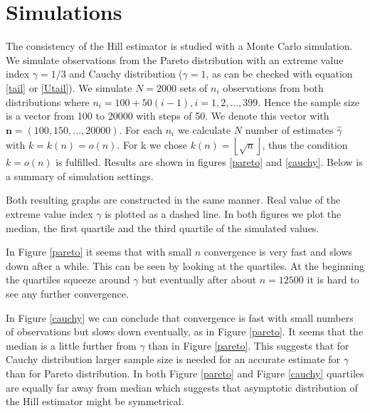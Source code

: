 \documentclass[english,12pt,a4paper,pdftex,sci,utf8]{aaltothesis} %
\begin{document}
\clearpage
\section{Simulations}
\label{simut}

The consistency of the Hill estimator is studied with a Monte Carlo simulation. We simulate observations from the Pareto distribution with an extreme value index $\gamma=1/3$ and Cauchy distribution ($\gamma=1$, as can be checked with equation \eqref{tail} or \eqref{Utail}). We simulate $N=2000$ sets of $n_i$ observations from both distributions where $n_i=100+50(i-1), i=1,2,...,399$. Hence the sample size is a vector from 100 to 20000 with steps of 50. We denote this vector with $\textbf{n}=(100,150,...,20000)$. For each $n_i$ we calculate $N$ number of estimates $\hat{\gamma}$ with $k=k(n)=o(n)$. For k we chose $k(n)=\left \lfloor \sqrt{n} \right \rfloor$, thus the condition $k=o(n)$ is fulfilled. Results are shown in figures \ref{pareto} and \ref{cauchy}. Below is a summary of simulation settings.


Both resulting graphs are constructed in the same manner. Real value of the extreme value index $\gamma$  is plotted as a dashed line. In both figures we plot the median, the first quartile and the third quartile of the simulated values.

In Figure \ref{pareto} it seems that with small $n$ convergence is very fast and slows down after a while. This can be seen by looking at the quartiles. At the beginning the quartiles squeeze around $\gamma$ but eventually after about $n=12500$ it is hard to see any further convergence.

In Figure \ref{cauchy} we can conclude that convergence is fast with small numbers of observations but slows down eventually, as in Figure \ref{pareto}. It seems that the median is a little further from $\gamma$ than in Figure \ref{pareto}. This suggests that for Cauchy distribution larger sample size is needed for an accurate estimate for $\gamma$ than for Pareto distribution. In both Figure \ref{pareto} and Figure \ref{cauchy} quartiles are equally far away from median which suggests that asymptotic distribution of the Hill estimator might be symmetrical.
\end{document}
